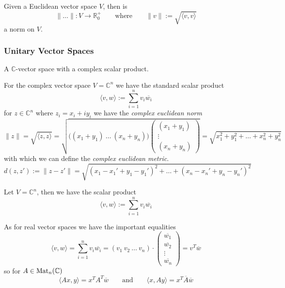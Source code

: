 \begin{corollary}\label{cor:euclid_norm}
   Given a Euclidean vector space \(V\), then is
   \[\|\ldots\|: V \to \mathbb{R}_0^+ \qquad\text{where}\qquad \|v\| := \sqrt{\langle v, v\rangle}\]
   a norm on \(V\).
\end{corollary}

\subsubsection{Unitary Vector Spaces}
\begin{definition}
   A \(\mathbb{C}\)-vector space with a complex scalar product.
\end{definition}
\begin{example}
   For the complex vector space \(V = \mathbb{C}^n\) we have the standard scalar product
   \[\langle v, w \rangle := \sum_{i=1}^n v_i \overline{w_i}\]
   for \(z \in \mathbb{C}^n\) where \(z_i = x_i + iy_i\) we have the \emph{complex euclidean norm}
   \[\|z\| = \sqrt{\langle z, z\rangle} = \sqrt{\big((x_1 + y_1)~\ldots~(x_n + y_n)\big) \begin{pmatrix}(x_1 + y_1)\\\vdots\\(x_n + y_n)\end{pmatrix}} = \sqrt{x_1^2 + y_1^2 + \ldots + x_n^2 + y_n^2}\]
   with which we can define the \emph{complex euclidean metric}.
   \[d(z, z') := \|z - z'\| = \sqrt{(x_1 - x_1' + y_1-y_1')^2 + \ldots + (x_n - x_n' + y_n-y_n')^2}\]
\end{example}

\begin{definition}\label{def:compl_scal_prod}
   Let \(V = \mathbb{C}^n\), then we have the scalar product
   \[\langle v, w \rangle := \sum_{i=1}^n v_i \overline{w_i}\]
\end{definition}
\begin{remark}
   As for real vector spaces we have the important equalities
   \[\langle v, w\rangle = \sum_{i=1}^n v_i \overline{w_i} = (v_1~v_2~\ldots~v_n) \cdot \begin{pmatrix}\overline{w_1}\\\overline{w_2}\\\vdots\\\overline{w_n}\end{pmatrix} = v^T\overline{w}\]
   so for \(A \in \operatorname{Mat}_n(\mathbb{C})\)
   \[\langle Ax, y\rangle = x^TA^T\overline{w} \qquad\text{and}\qquad \langle x, Ay \rangle = x^T\overline{A}\overline{w}\]
\end{remark}

